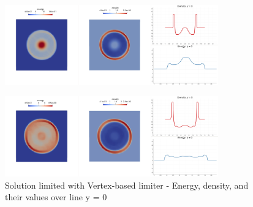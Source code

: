 	\begin{figure}[H]
		\begin{center}
			\includegraphics[width=0.82\textwidth]{img/limit/l5.jpg}
		\end{center}
	\end{figure}\vspace{-12mm}
	\begin{figure}[H]
		\begin{center}
			\includegraphics[width=0.82\textwidth]{img/limit/l6.jpg}
			\vspace{-4mm}
			\caption{Solution limited with Vertex-based limiter - Energy, density, and their values over line y = 0}
		\end{center}
	\end{figure}
